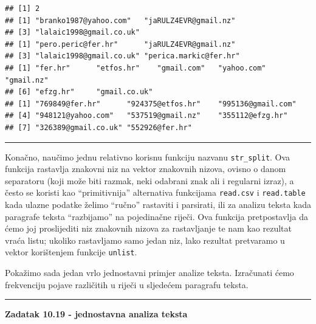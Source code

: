 \documentclass[]{book}
\theoremstyle{definition}
\theoremstyle{definition}
\theoremstyle{definition}
\theoremstyle{remark}
\begin{document}
\begin{verbatim}
## [1] 2
## [1] "branko1987@yahoo.com"   "jaRULZ4EVR@gmail.nz"   
## [3] "lalaic1998@gmail.co.uk"
## [1] "pero.peric@fer.hr"      "jaRULZ4EVR@gmail.nz"   
## [3] "lalaic1998@gmail.co.uk" "perica.markic@fer.hr"  
## [1] "fer.hr"      "etfos.hr"    "gmail.com"   "yahoo.com"   "gmail.nz"   
## [6] "efzg.hr"     "gmail.co.uk"
## [1] "769849@fer.hr"      "924375@etfos.hr"    "995136@gmail.com"  
## [4] "948121@yahoo.com"   "537519@gmail.nz"    "355112@efzg.hr"    
## [7] "326389@gmail.co.uk" "552926@fer.hr"
\end{verbatim}

\begin{center}\rule{0.5\linewidth}{\linethickness}\end{center}

Konačno, naučimo jednu relativno korisnu funkciju nazvanu
\texttt{str\_split}. Ova funkcija rastavlja znakovni niz na vektor
znakovnih nizova, ovisno o danom separatoru (koji može biti razmak, neki
odabrani znak ali i regularni izraz), a često se koristi kao
``primitivnija'' alternativa funkcijama \texttt{read.csv} i
\texttt{read.table} kada ulazne podatke želimo ``ručno'' rastaviti i
parsirati, ili za analizu teksta kada paragrafe teksta ``razbijamo'' na
pojedinačne riječi. Ova funkcija pretpostavlja da ćemo joj proslijediti
niz znakovnih nizova za rastavljanje te nam kao rezultat vraća listu;
ukoliko rastavljamo samo jedan niz, lako rezultat pretvaramo u vektor
korištenjem funkcije \texttt{unlist}.

Pokažimo sada jedan vrlo jednostavni primjer analize teksta. Izračunati
ćemo frekvenciju pojave različitih u riječi u sljedećem paragrafu
teksta.

\begin{center}\rule{0.5\linewidth}{\linethickness}\end{center}

\textbf{Zadatak 10.19 - jednostavna analiza teksta}
\end{document}
